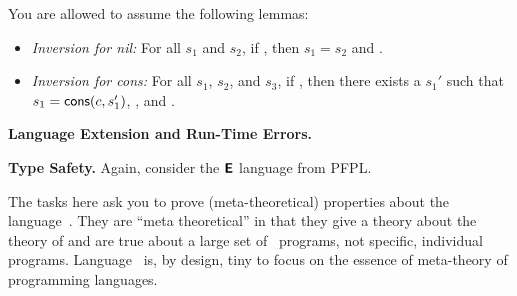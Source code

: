 \documentclass[12pt]{exam}
\begin{document}
\begin{questions}
\begin{parts}
\begin{subparts}
You are allowed to assume the following lemmas:

\begin{itemize}
\item {\em Inversion for {\sf nil}:} For all $s_1$ and $s_2$, if , then $s_1 = s_2$ and .
\item {\em Inversion for {\sf cons}:} For all $s_1$, $s_2$, and $s_3$, if , then there exists a $s_1'$ such that $s_1 = \mathsf{cons}(c, s_1')$, , and .
\end{itemize}

\end{subparts}

\end{parts}

\question \textbf{Language Extension and Run-Time Errors.}

\question \textbf{Type Safety.} Again, consider the $\textbf{\textsf{E}}$ language from PFPL. 

The tasks here ask you to prove (meta-theoretical) properties about the
language~\Lnumstr. They are ``meta theoretical''
in that they give a theory about the theory of \Lnumstr and are true about a
large set of \Lnumstr~programs, not specific, individual programs.
Language~\Lnumstr{} is, by design, tiny to focus on the essence of
meta-theory of programming languages.


\end{questions}
\end{document}
